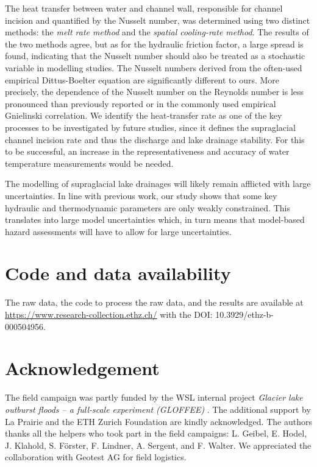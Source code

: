 The heat transfer between water and channel wall, responsible for channel incision and quantified by the Nusselt number, was determined using two distinct methods: the \textit{melt rate method} and the \textit{spatial cooling-rate method}. The results of the two methods agree, but as for the hydraulic friction factor, a large spread is found, indicating that the Nusselt number should also be treated as a stochastic variable in modelling studies.
%
The Nusselt numbers derived from the often-used empirical Dittus-Boelter equation are significantly different to ours. More precisely, the dependence of the Nusselt number on the Reynolds number is less pronounced than previously reported \citep[e.g.][]{Lunardini&al1986,Clarke2003,Vincent&al2010} or in the commonly used empirical Gnielinski correlation.
%
We identify the heat-transfer rate as one of the key processes to be investigated by future studies, since it defines the supraglacial channel incision rate and thus the discharge and lake drainage stability. For this to be successful, an increase in the representativeness and accuracy of water temperature measurements would be needed.

The modelling of supraglacial lake drainages will likely remain afflicted with large uncertainties. In line with previous work, our study shows that some key hydraulic and thermodynamic parameters are only weakly constrained. This translates into large model uncertainties which, in turn means that model-based hazard assessments will have to allow for large uncertainties.

\section{Code and data availability}

The raw data, the code to process the raw data, and the results are available at \url{https://www.research-collection.ethz.ch/} with the DOI: 10.3929/ethz-b-000504956.

\section{Acknowledgement}

The field campaign was partly funded by the WSL internal project \textit{Glacier lake outburst floods – a full-scale experiment (GLOFFEE)} . The additional support by La Prairie and the ETH Zurich Foundation are kindly acknowledged. The authors thanks all the helpers who took part in the field campaigns: L. Geibel, E. Hodel, J. Klahold, S. Förster, F. Lindner, A. Sergent, and F. Walter. We appreciated the collaboration with Geotest AG for field logistics.
